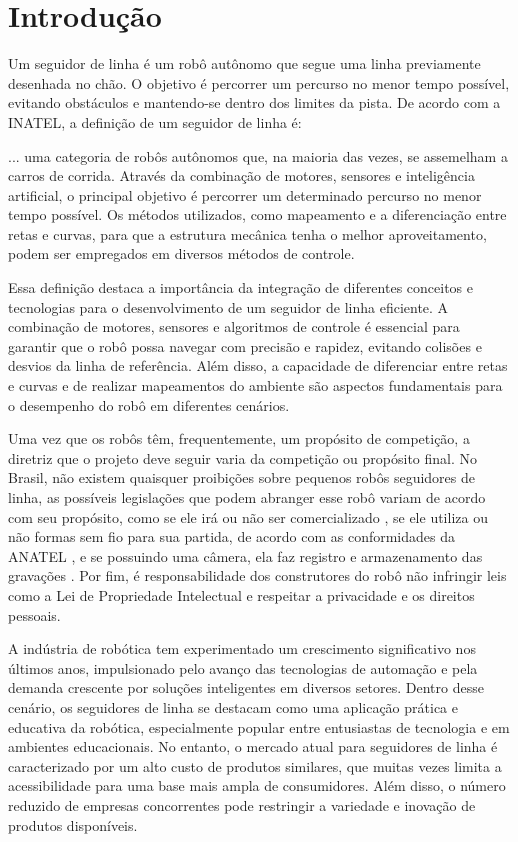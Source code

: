 \chapter{Introdução}

Um seguidor de linha é um robô autônomo que segue uma linha previamente
desenhada no chão. O objetivo é percorrer um percurso no menor tempo possível,
evitando obstáculos e mantendo-se dentro dos limites da pista. De acordo com a
INATEL, a definição de um seguidor de linha é:

\begin{citacao}
  \lbrack...\rbrack 
  \space
  uma categoria de robôs autônomos que, na maioria das vezes, se assemelham a
  carros de corrida. Através da combinação de motores, sensores e inteligência
  artificial, o principal objetivo é percorrer um determinado percurso no menor
  tempo possível. Os métodos utilizados, como mapeamento e a diferenciação entre
  retas e curvas, para que a estrutura mecânica tenha o melhor aproveitamento,
  podem ser empregados em diversos métodos de controle.
  \cite{INATEL:Seguidor-de-Linha}
\end{citacao}

Essa definição destaca a importância da integração de diferentes conceitos e
tecnologias para o desenvolvimento de um seguidor de linha eficiente. A
combinação de motores, sensores e algoritmos de controle é essencial para
garantir que o robô possa navegar com precisão e rapidez, evitando colisões e
desvios da linha de referência. Além disso, a capacidade de diferenciar entre
retas e curvas e de realizar mapeamentos do ambiente são aspectos fundamentais
para o desempenho do robô em diferentes cenários.

Uma vez que os robôs têm, frequentemente, um propósito de competição, a diretriz
que o projeto deve seguir varia da competição ou propósito final. No Brasil, não
existem quaisquer proibições sobre pequenos robôs seguidores de linha, as
possíveis legislações que podem abranger esse robô variam de acordo com seu
propósito, como se ele irá ou não ser comercializado \cite{Lei:8078:1990}, se
ele utiliza ou não formas sem fio para sua partida, de acordo com as
conformidades da ANATEL \cite{ANATEL:Manual-de-Orientacoes}, e se possuindo uma
câmera, ela faz registro e armazenamento das gravações \cite{Lei:12651:2012}.
Por fim, é responsabilidade dos construtores do robô não infringir leis como a
Lei de Propriedade Intelectual \cite{Lei:9279:1996} e respeitar a privacidade e
os direitos pessoais.

A indústria de robótica tem experimentado um crescimento significativo nos
últimos anos, impulsionado pelo avanço das tecnologias de automação e pela
demanda crescente por soluções inteligentes em diversos setores. Dentro desse
cenário, os seguidores de linha se destacam como uma aplicação prática e
educativa da robótica, especialmente popular entre entusiastas de tecnologia e
em ambientes educacionais. No entanto, o mercado atual para seguidores de linha
é caracterizado por um alto custo de produtos similares, que muitas vezes limita
a acessibilidade para uma base mais ampla de consumidores. Além disso, o número
reduzido de empresas concorrentes pode restringir a variedade e inovação de
produtos disponíveis.

